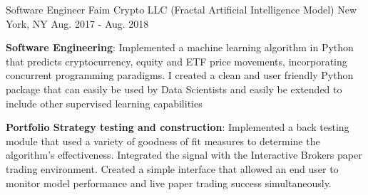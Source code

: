 \begin{cventries}
   \cventry 
        {Software Engineer}
        {Faim Crypto LLC (Fractal Artificial Intelligence Model)}
        {New York, NY}
        {Aug. 2017 - Aug. 2018}
        {
          \begin{cvitems}
              \item{\textbf{Software Engineering}: Implemented a machine learning algorithm in Python that predicts cryptocurrency, equity and ETF price movements, incorporating concurrent programming paradigms. I created a clean and user friendly Python package that can easily be used by Data Scientists and easily be extended to include other supervised learning capabilities
              }
              \item{\textbf{Portfolio Strategy testing and construction}: Implemented a back testing module that used a variety of goodness of fit measures to determine the algorithm's effectiveness. Integrated the signal with the Interactive Brokers paper trading environment. Created a simple interface that allowed an end user to monitor model performance and live paper trading success simultaneously.
              }
          \end{cvitems}
        }
\end{cventries}
